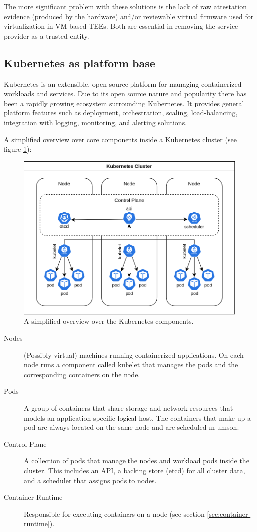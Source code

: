The more significant problem with these solutions is the lack of raw attestation
evidence (produced by the hardware) and/or reviewable virtual firmware used for
virtualization in VM-based TEEs. Both are essential in removing the service
provider as a trusted entity.

\subsection{Kubernetes as platform base}
\label{sec:kubernetes-platform-base}

Kubernetes is an extensible, open source platform for managing containerized
workloads and services. Due to its open source nature and popularity there has
been a rapidly growing ecosystem surrounding Kubernetes. It provides general
platform features such as deployment, orchestration, scaling, load-balancing,
integration with logging, monitoring, and alerting solutions.

A simplified overview over core components inside a Kubernetes cluster (see
figure \ref{fig:kubernetes-overview}):

\begin{figure}[ht]
  \centering
  \includegraphics[width=0.8\linewidth]{resources/kubernetes-overview.png}
  \caption{A simplified overview over the Kubernetes components.}
  \label{fig:kubernetes-overview}
\end{figure}

\begin{description}
  \item[Nodes]
    (Possibly virtual) machines running containerized applications. On each node
    runs a component called kubelet that manages the pods and the corresponding
    containers on the node.
  \item[Pods]
    A group of containers that share storage and network resources that models
    an application-specific logical host. The containers that make up a pod are
    always located on the same node and are scheduled in unison.
  \item[Control Plane]
    A collection of pods that manage the nodes and workload pods inside the
    cluster. This includes an API, a backing store (etcd) for all cluster data,
    and a scheduler that assigns pods to nodes.
  \item[Container Runtime]
    Responsible for executing containers on a node (see section
    \ref{sec:container-runtime}).
\end{description}

